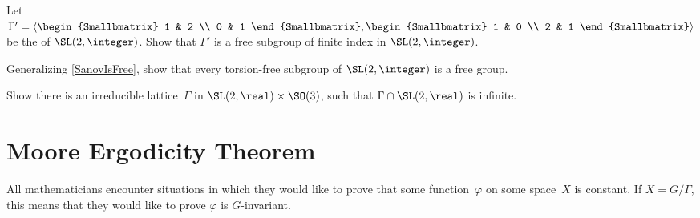 \begin{exercises}
\item \label{SanovIsFree}
Let 
	$\Gamma' = \left\langle 
	\begin{Smallbmatrix} 1 & 2 \\ 0 & 1 \end{Smallbmatrix} ,
	\begin{Smallbmatrix} 1 & 0 \\ 2 & 1 \end{Smallbmatrix} \right\rangle $
be the  of $\SL(2,\integer)$.
Show that $\Gamma'$ is a free subgroup of finite index in $\SL(2,\integer)$.

\item \label{SL2ZLotsFree}
Generalizing \cref{SanovIsFree}, show that every torsion-free subgroup of $\SL(2,\integer)$ is a free group.

\item \label{irredinSL2xSO3}
 Show there is an irreducible lattice~$\Gamma$ in
$\SL(2,\real) \times \SO(3)$, such that $\Gamma \cap
\SL(2,\real)$ is infinite.

\end{exercises}






\section{Moore Ergodicity Theorem} \label{MooreErgBasicSect}

All mathematicians encounter situations in which they would like to prove that some function~$\varphi$ on some space~$X$ is constant. If $X = G/\Gamma$, this means that they would like to prove $\varphi $ is $G$-invariant. 

